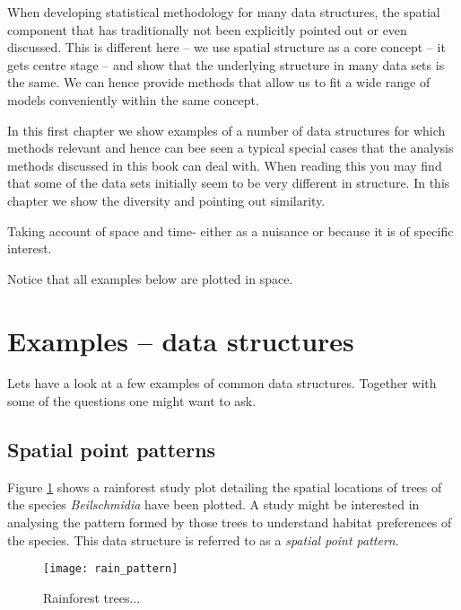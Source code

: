 When developing statistical methodology for many data structures, the spatial component that has traditionally not been explicitly pointed out or even discussed. 
This is different here --  we use spatial structure as a core concept -- it gets centre stage -- and show that the underlying structure in many data sets is the same. We can hence provide methods that allow us to fit a wide range of models conveniently within the same concept.

In this first chapter we show examples of a number of data structures for which methods relevant and hence can bee seen a typical special cases that the analysis methods discussed in this book can deal with. When reading this you may find that some of the data sets initially seem to be very different in structure. In this chapter we show the diversity and pointing out similarity.

Taking account of space and time- either as a nuisance or because it is of specific interest.

Notice that all examples below are plotted in space.

\section{Examples -- data structures}

Lets have a look at a few examples of common data structures. Together with some of the questions one might want to ask.

\subsection{Spatial point patterns}\label{subs:spp}
Figure \ref{fig:rainpattern} shows  a rainforest study plot 
detailing the spatial locations of trees of the species \textit{Beilschmidia} have been plotted. A study might be interested in analysing the pattern formed by those trees to understand habitat preferences of the species.  This data structure is referred to as a \textit{spatial point pattern}.
\begin{figure}
\centering
\texttt{[image: rain\_pattern]}
\caption{\label{fig:rainpattern} Rainforest trees...}
\end{figure}

